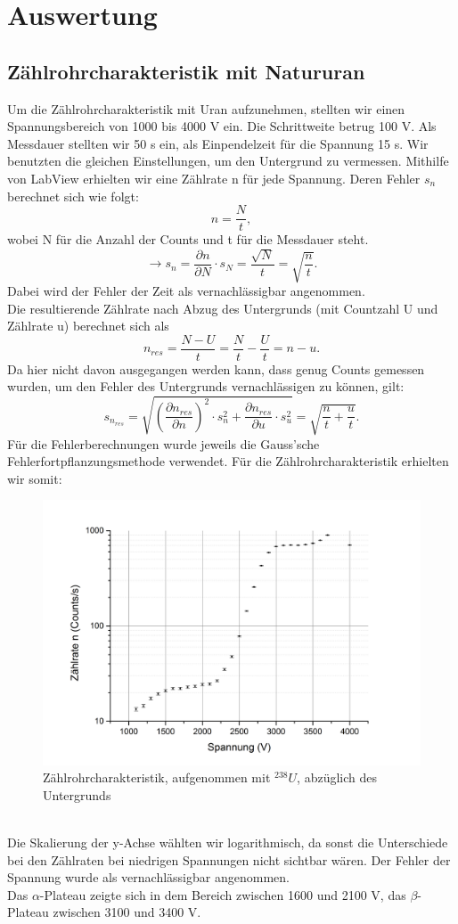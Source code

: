 \clearpage
\section{Auswertung}
\subsection{Zählrohrcharakteristik mit Natururan}
Um die Zählrohrcharakteristik mit Uran aufzunehmen, stellten wir einen Spannungsbereich von 1000 bis 4000 V ein. Die Schrittweite betrug 100 V. Als Messdauer stellten wir 50 s ein, als Einpendelzeit für die Spannung 15 s. Wir benutzten die gleichen Einstellungen, um den Untergrund zu vermessen. Mithilfe von LabView erhielten wir eine Zählrate n für jede Spannung. Deren Fehler $s_{n}$ berechnet sich wie folgt: \[n=\frac{N}{t},\] wobei N für die Anzahl der Counts und t für die Messdauer steht. \[\rightarrow s_{n}=\frac{\partial n}{\partial N}\cdot s_{N}=\frac{\sqrt{N}}{t}=\sqrt{\frac{n}{t}}.\] Dabei wird der Fehler der Zeit als vernachlässigbar angenommen. \\
Die resultierende Zählrate nach Abzug des Untergrunds (mit Countzahl U und Zählrate u) berechnet sich als \[n_{res}=\frac{N-U}{t}=\frac{N}{t}-\frac{U}{t}=n-u.\]
Da hier nicht davon ausgegangen werden kann, dass genug Counts gemessen wurden, um den Fehler des Untergrunds vernachlässigen zu können, gilt: \[s_{n_{res}}=\sqrt{(\frac{\partial n_{res}}{\partial n})^{2}\cdot s_{n}^{2}+\frac{\partial n_{res}}{\partial u}\cdot s_{u}^{2}}=\sqrt{\frac{n}{t}+\frac{u}{t}}.\] Für die Fehlerberechnungen wurde jeweils die Gauss'sche Fehlerfortpflanzungsmethode verwendet. Für die Zählrohrcharakteristik erhielten wir somit:
\begin{figure}[h]
\begin{center}
\includegraphics[scale=0.45]{Bilder/uranmess2}
\caption{Zählrohrcharakteristik, aufgenommen mit $^{238}U$, abzüglich des Untergrunds}
\end{center}
\end{figure}
~\\
Die Skalierung der y-Achse wählten wir logarithmisch, da sonst die Unterschiede bei den Zählraten bei niedrigen Spannungen nicht sichtbar wären. Der Fehler der Spannung wurde als vernachlässigbar angenommen.\\
Das $\alpha$-Plateau zeigte sich in dem Bereich zwischen 1600 und 2100 V, das $\beta$-Plateau zwischen 3100 und 3400 V.
